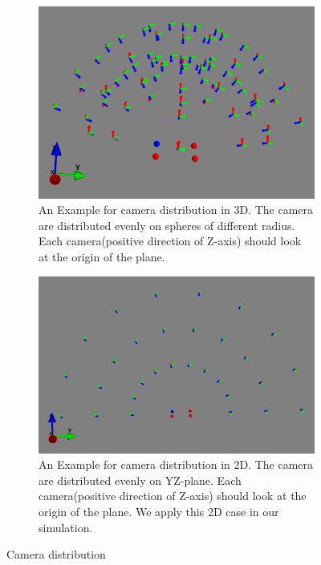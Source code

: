 \begin{figure}[H]
  \centering
  \begin{subfigure}[b]{0.8\linewidth}
    \includegraphics[width=\linewidth]{./fig/cam3D.png}
    \caption{An Example for camera distribution in 3D. The camera are distributed evenly on spheres of different radius. Each camera(positive direction of Z-axis) should look at the origin of the plane.}
  \end{subfigure}
  \begin{subfigure}[b]{0.8\linewidth}
    \includegraphics[width=\linewidth]{./fig/cam2D.png}
    \caption{An Example for camera distribution in 2D. The camera are distributed evenly on YZ-plane. Each camera(positive direction of Z-axis) should look at the origin of the plane. We apply this 2D case in our simulation.}
  \end{subfigure}
  \caption{Camera distribution}
  \label{fig:cam3D2D}
\end{figure}


